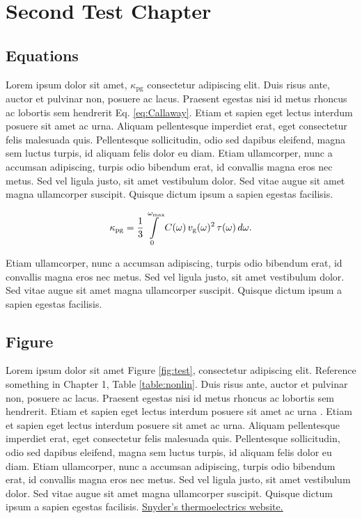 \chapter{Second Test Chapter}

\section{Equations}
Lorem ipsum dolor sit amet, $\kappa_\mathrm{pg}$
consectetur adipiscing elit. Duis risus ante, auctor et pulvinar non, posuere ac lacus. Praesent egestas nisi id metus rhoncus ac lobortis sem hendrerit Eq. \ref{eq:Callaway}. Etiam et sapien eget lectus interdum posuere sit amet ac urna. Aliquam pellentesque imperdiet erat, eget consectetur felis malesuada quis. Pellentesque sollicitudin, odio sed dapibus eleifend, magna sem luctus turpis, id aliquam felis dolor eu diam. Etiam ullamcorper, nunc a accumsan adipiscing, turpis odio bibendum erat, id convallis magna eros nec metus. Sed vel ligula justo, sit amet vestibulum dolor. Sed vitae augue sit amet magna ullamcorper suscipit. Quisque dictum ipsum a sapien egestas facilisis. 

\begin{equation}
  \kappa_\mathrm{pg}=\frac{1}{3} \intop _0 ^{\omega_\mathrm{max}} C(\omega) \, v_\mathrm{g}(\omega)^2 \, \tau(\omega) \, d\omega. \label{eq:Callaway}
\end{equation}

Etiam ullamcorper, nunc a accumsan adipiscing, turpis odio bibendum erat, id convallis magna eros nec metus. Sed vel ligula justo, sit amet vestibulum dolor. Sed vitae augue sit amet magna ullamcorper suscipit. Quisque dictum ipsum a sapien egestas facilisis. 

\section{Figure}
\noindent Lorem ipsum dolor sit amet Figure \ref{fig:test}, consectetur adipiscing elit. Reference something in Chapter 1, Table \ref{table:nonlin}. Duis risus ante, auctor et pulvinar non, posuere ac lacus. Praesent egestas nisi id metus rhoncus ac lobortis sem hendrerit. Etiam et sapien eget lectus interdum posuere sit amet ac urna \citep{latex:companion}. Etiam et sapien eget lectus interdum posuere sit amet ac urna. Aliquam pellentesque imperdiet erat, eget consectetur felis malesuada quis. Pellentesque sollicitudin, odio sed dapibus eleifend, magna sem luctus turpis, id aliquam felis dolor eu diam. Etiam ullamcorper, nunc a accumsan adipiscing, turpis odio bibendum erat, id convallis magna eros nec metus. Sed vel ligula justo, sit amet vestibulum dolor. Sed vitae augue sit amet magna ullamcorper suscipit. Quisque dictum ipsum a sapien egestas facilisis. \href{http://thermoelectrics.matsci.northwestern.edu/}{Snyder's thermoelectrics website.}

